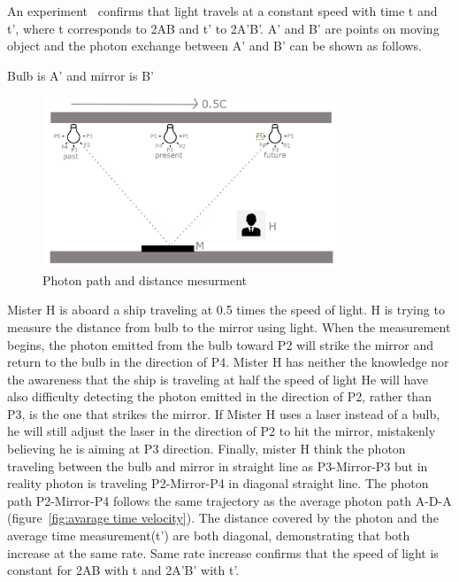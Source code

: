 \documentclass{article}
\begin{document}
    An experiment~\cite{michelson1879velocity} confirms that light travels at a constant speed with time t and t', where t corresponds to 2AB and t' to 2A'B'. A' and B' are points on moving object and the photon exchange between A' and B' can be shown as follows.

    Bulb is A' and mirror is B'


    \begin{figure}[H]
        \centering
        \includegraphics[width=0.8\textwidth]{images/photon_path_and_distance}
        \caption{Photon path and distance mesurment}
        \label{fig:photon_path_and_distance}
    \end{figure}

    Mister H is aboard a ship traveling at 0.5 times the speed of light.
    H is trying to measure the distance from bulb to the mirror using light.
    When the measurement begins, the photon emitted from the bulb toward P2 will strike the mirror and return to the bulb in the direction of P4. Mister H has neither the knowledge nor the awareness that the ship is traveling at half the speed of light He will have also difficulty detecting the photon emitted in the direction of P2, rather than P3, is the one that strikes the mirror.
    If Mister H uses a laser instead of a bulb, he will still adjust the laser in the direction of P2 to hit the mirror, mistakenly believing he is aiming at P3 direction.
    Finally, mister H think the photon traveling between the bulb and mirror in straight line as P3-Mirror-P3 but in reality photon is traveling P2-Mirror-P4 in diagonal straight line.
    The photon path P2-Mirror-P4 follows the same trajectory as the average photon path A-D-A (figure~\ref{fig:avarage time velocity}). The distance covered by the photon and the average time measurement(t’) are both diagonal, demonstrating that both increase at the same rate.
    Same rate increase confirms that the speed of light is constant for  2AB with t and 2A'B' with t'.
\end{document}
